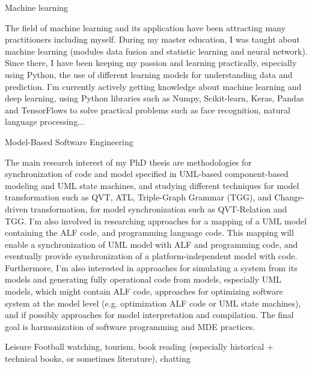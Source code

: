 \begin{cventries}
\cvinterest
{Machine learning}
{\begin{cvitems}
		\item{The field of machine learning and its application have been attracting many practitioners including myself.
During my master education, I was taught about machine learning (modules data fusion and statistic learning and neural network). 
Since there, I have been keeping my passion and learning practically, especially using Python, the use of different learning models for understanding data and prediction. I'm currently actively getting knowledge about machine learning and deep learning, using Python libraries such as Numpy, Scikit-learn, Keras, Pandas and TensorFlows to solve practical problems such as face recognition, natural language processing...}
\end{cvitems}
}

\cvinterest
{Model-Based Software Engineering}
{
	\begin{cvitems}
	\item{The main research interest of my PhD thesis are methodologies for synchronization of code and model specified in UML-based component-based modeling and UML state machines, and studying different techniques for model transformation such as QVT, ATL, Triple-Graph Grammar (TGG), and Change-driven transformation, for model synchronization such as QVT-Relation and TGG.	
I'm also involved in researching approaches for a mapping of a UML model containing the ALF code, and programming language code.
This mapping will enable a synchronization of UML model with ALF and programming code, and eventually provide synchronization of a platform-independent model with code.
Furthermore, I'm also interested in approaches for simulating a system from its models and generating fully operational code from models, especially UML models, which might contain ALF code, approaches for optimizing software system at the model level (e.g. optimization ALF code or UML state machines), and if possibly approaches for model interpretation and compilation.
The final goal is harmonization of software programming and MDE practices.}
\end{cvitems}}


\cvinterest
{Leisure}
{Football watching, tourism, book reading (especially historical + technical books, or sometimes literature), chatting}


\end{cventries}
